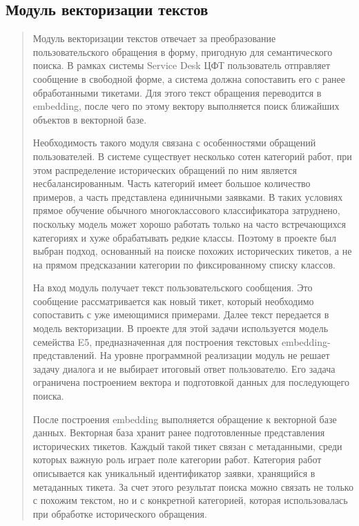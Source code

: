 \hypertarget{ux43cux43eux434ux443ux43bux44c-ux432ux435ux43aux442ux43eux440ux438ux437ux430ux446ux438ux438-ux442ux435ux43aux441ux442ux43eux432}{%
\subsection{Модуль векторизации
текстов}\label{ux43cux43eux434ux443ux43bux44c-ux432ux435ux43aux442ux43eux440ux438ux437ux430ux446ux438ux438-ux442ux435ux43aux441ux442ux43eux432}}

\begin{quote}
Модуль векторизации текстов отвечает за преобразование пользовательского
обращения в форму, пригодную для семантического поиска. В рамках системы
Service Desk ЦФТ пользователь отправляет сообщение в свободной форме, а
система должна сопоставить его с ранее обработанными тикетами. Для этого
текст обращения переводится в embedding, после чего по этому вектору
выполняется поиск ближайших объектов в векторной базе.

Необходимость такого модуля связана с особенностями обращений
пользователей. В системе существует несколько сотен категорий работ, при
этом распределение исторических обращений по ним является
несбалансированным. Часть категорий имеет большое количество примеров, а
часть представлена единичными заявками. В таких условиях прямое обучение
обычного многоклассового классификатора затруднено, поскольку модель
может хорошо работать только на часто встречающихся категориях и хуже
обрабатывать редкие классы. Поэтому в проекте был выбран подход,
основанный на поиске похожих исторических тикетов, а не на прямом
предсказании категории по фиксированному списку классов.

На вход модуль получает текст пользовательского сообщения. Это сообщение
рассматривается как новый тикет, который необходимо сопоставить с уже
имеющимися примерами. Далее текст передается в модель векторизации. В
проекте для этой задачи используется модель семейства E5,
предназначенная для построения текстовых embedding-представлений. На
уровне программной реализации модуль не решает задачу диалога и не
выбирает итоговый ответ пользователю. Его задача ограничена построением
вектора и подготовкой данных для последующего поиска.

После построения embedding выполняется обращение к векторной базе
данных. Векторная база хранит ранее подготовленные представления
исторических тикетов. Каждый такой тикет связан с метаданными, среди
которых важную роль играет поле категории работ. Категория работ
описывается как уникальный идентификатор заявки, хранящийся в метаданных
тикета. За счет этого результат поиска можно связать не только с похожим
текстом, но и с конкретной категорией, которая использовалась при
обработке исторического обращения.


\end{quote}
